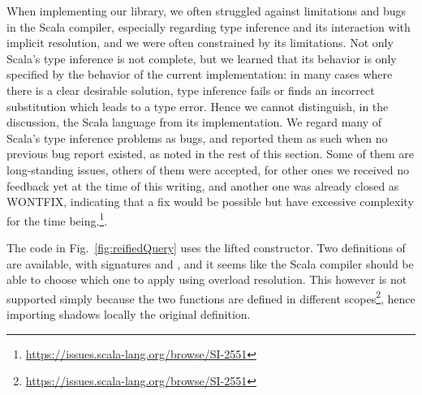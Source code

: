 When implementing our library, we often struggled against limitations and bugs in the Scala compiler, especially regarding type inference and its interaction with implicit resolution, and we were often constrained by its limitations. Not only Scala's type inference is not complete, but we learned that its behavior is only specified by the behavior of the current implementation: in many cases where there is a clear desirable solution, type inference fails or finds an incorrect substitution which leads to a type error. Hence we cannot distinguish, in the discussion, the Scala language from its implementation.
We regard many of Scala's type inference problems as bugs, and reported them as such when no previous bug report existed, as noted in the rest of this section. Some of them are long-standing issues, others of them were accepted, for other ones we received no feedback yet at the time of this writing, and another one was already closed as WONTFIX, indicating that a fix would be possible but have excessive complexity for the time being.\footnote{\url{https://issues.scala-lang.org/browse/SI-2551}}.

The code in Fig.~\ref{fig:reifiedQuery} uses the lifted  constructor. Two definitions of  are available, with signatures  and , and it seems like the Scala compiler should be able to choose which one to apply using overload resolution. This however is not supported simply because the two functions are defined in different scopes\footnote{\url{https://issues.scala-lang.org/browse/SI-2551}}, hence importing  shadows locally the original definition.




